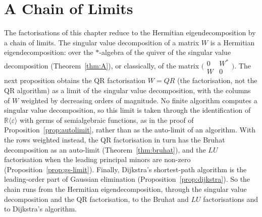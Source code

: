 \documentclass[12pt, a4paper]{report}
\theoremstyle{plain}
\theoremstyle{definition}
\theoremstyle{remark}
\theoremstyle{plain}
\newcommand{\RR}{\mathbb{R}}
\begin{document}
\section{A Chain of Limits}
\label{sec:chain}
The factorisations of this chapter reduce to the Hermitian eigendecomposition by a chain of limits. The singular value decomposition of a matrix $W$ is a Hermitian eigendecomposition: over the $*$-algebra of the quiver of the singular value decomposition (Theorem~\ref{thm:A}), or classically, of the matrix $\bigl(\begin{smallmatrix}0&W^*\\W&0\end{smallmatrix}\bigr)$. The next proposition obtains the QR factorisation $W=QR$ (the factorisation, not the QR algorithm) as a limit of the singular value decomposition, with the columns of $W$ weighted by decreasing orders of magnitude. No finite algorithm computes a singular value decomposition, so this limit is taken through the identification of $\RR\langle\varepsilon\rangle$ with germs of semialgebraic functions, as in the proof of Proposition~\ref{prop:autolimit}, rather than as the auto-limit of an algorithm. With the rows weighted instead, the QR factorisation in turn has the Bruhat decomposition as an auto-limit (Theorem~\ref{thm:bruhat}), and the $LU$ factorisation when the leading principal minors are non-zero (Proposition~\ref{prop:gs-limit}). Finally, Dijkstra's shortest-path algorithm is the leading-order part of Gaussian elimination (Proposition~\ref{prop:dijkstra}). So the chain runs from the Hermitian eigendecomposition, through the singular value decomposition and the QR factorisation, to the Bruhat and $LU$ factorisations and to Dijkstra's algorithm.
\end{document}
